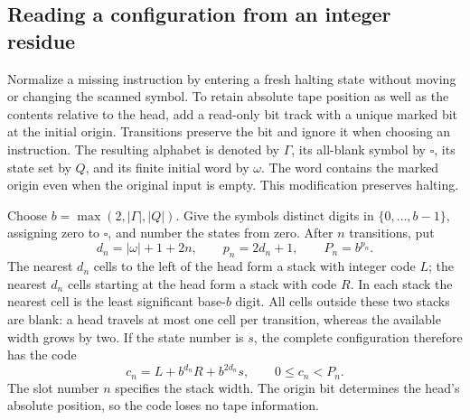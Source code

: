 \subsection{Reading a configuration from an integer residue}

Normalize a missing instruction by entering a fresh halting state without
moving or changing the scanned symbol. To retain absolute
tape position as well as the contents relative to the head, add a
read-only bit track with a unique marked bit at the initial origin.
Transitions preserve the bit and ignore it when choosing an instruction.
The resulting alphabet is denoted by $\Gamma$, its all-blank symbol by
$\square$, its state set by $Q$, and its finite initial word by $\omega$.
The word contains the marked origin even when the original input is
empty.  This modification preserves halting.

Choose $b=\max(2,|\Gamma|,|Q|)$.  Give the symbols distinct digits in
$\{0,\ldots,b-1\}$, assigning zero to $\square$, and number the states
from zero.  After $n$ transitions, put
\[
 d_n=|\omega|+1+2n,\qquad p_n=2d_n+1,\qquad P_n=b^{p_n}.
\]
The nearest $d_n$ cells to the left of the head form a stack with
integer code $L$; the nearest $d_n$ cells starting at the head form a
stack with code $R$.  In each stack the nearest cell is the least
significant base-$b$ digit.  All cells outside these two stacks are
blank: a head travels at most one cell per transition, whereas the
available width grows by two.  If the state number is $s$, the complete
configuration therefore has the code
\begin{equation}\label{eq:lattice-code}
 c_n=L+b^{d_n}R+b^{2d_n}s,\qquad 0\le c_n<P_n.
\end{equation}
The slot number $n$ specifies the stack width.  The origin bit determines
the head's absolute position, so the code loses no tape information.

